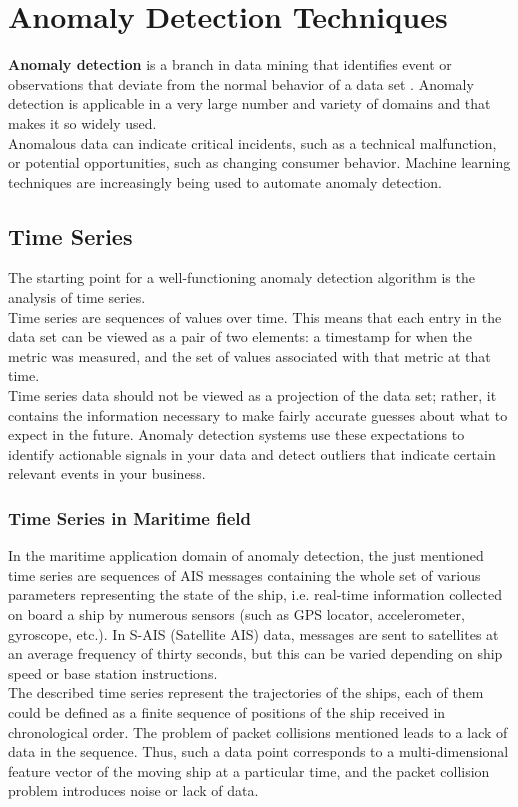     
\clearpage  

\section{Anomaly Detection Techniques}

    \textbf{Anomaly detection} is a branch in data mining that identifies event or observations that deviate from the normal behavior of a data set \cite{anomaly_detection}. Anomaly detection is applicable in a very large number and variety of domains and that makes it so widely used.
    \\
    Anomalous data can indicate critical incidents, such as a technical malfunction, or potential opportunities, such as changing consumer behavior. Machine learning techniques are increasingly being used to automate anomaly detection.
    
    \subsection{Time Series}
    The starting point for a well-functioning anomaly detection algorithm is the analysis of time series.
    \\
    Time series are sequences of values over time. This means that each entry in the data set can be viewed as a pair of two elements: a timestamp for when the metric was measured, and the set of values associated with that metric at that time. 
    \\ 
    Time series data should not be viewed as a projection of the data set; rather, it contains the information necessary to make fairly accurate guesses about what to expect in the future. Anomaly detection systems use these expectations to identify actionable signals in your data and detect outliers that indicate certain relevant events in your business.
    
    \subsubsection{Time Series in Maritime field}
    In the maritime application domain of anomaly detection, the just mentioned time series are sequences of AIS messages containing the whole set of various parameters representing the state of the ship, i.e. real-time information collected on board a ship by numerous sensors (such as GPS locator, accelerometer, gyroscope, etc.). 
    In S-AIS (Satellite AIS) data, messages are sent to satellites at an average frequency of thirty seconds, but this can be varied depending on ship speed or base station instructions. 
    \\
    The described time series represent the trajectories of the ships, each of them could be defined as a finite sequence of positions of the ship received in chronological order. The problem of packet collisions mentioned leads to a lack of data in the sequence. Thus, such a data point corresponds to a multi-dimensional feature vector of the moving ship at a particular time, and the packet collision problem introduces noise or lack of data.

